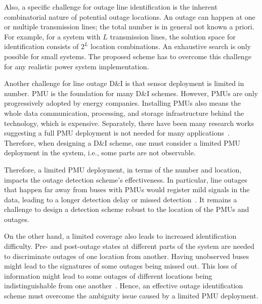Also, a specific challenge for outage line identification is the inherent combinatorial nature of potential outage locations. An outage can happen at one or multiple transmission lines; the total number is in general not known a priori. For example, for a system with $L$ transmission lines, the solution space for identification consists of $2^L$ location combinations. An exhaustive search is only possible for small systems. The proposed scheme has to overcome this challenge for any realistic power system implementation.


Another challenge for line outage D\&I is that sensor deployment is limited in number. 
PMU is the foundation for many D\&I schemes. However, PMUs are only progressively adopted by energy companies. Installing PMUs also means the whole data communication, processing, and storage infrastructure behind the technology, which is expensive. Separately, there have been many research works suggesting a full PMU deployment is not needed for many applications~\cite{aminifar2014synchrophasor}. Therefore, when designing a D\&I scheme, one must consider a limited PMU deployment in the system, i.e., some parts are not observable.

Therefore, a limited PMU deployment, in terms of the number and location, impacts the outage detection scheme’s effectiveness. In particular, line outages that happen far away from buses with PMUs would register mild signals in the data, leading to a longer detection delay or missed detection~\cite{yang2020control}. It remains a challenge to design a detection scheme robust to the location of the PMUs and outages. 

On the other hand, a limited coverage also leads to increased identification difficulty. Pre- and post-outage states at different parts of the system are needed to discriminate outages of one location from another. Having unobserved buses might lead to the signatures of some outages being missed out. This loss of information might lead to some outages of different locations being indistinguishable from one another~\cite{Wu2015,Costilla-Enriquez2019,yang2021dynamic}. Hence, an effective outage identification scheme must overcome the ambiguity issue caused by a limited PMU deployment.


